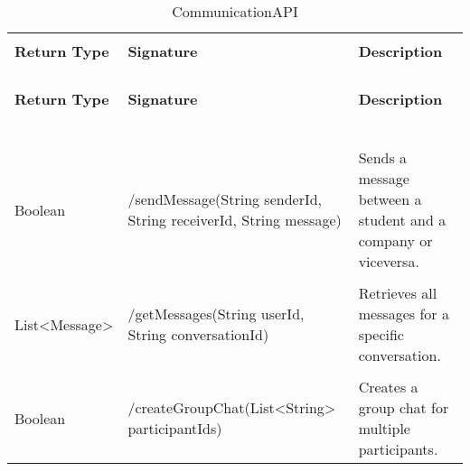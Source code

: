 \begin{longtable}{p{}p{}p{}}
    \caption{CommunicationAPI}
    \vspace{0.5em}\\
    \hline
    \vspace{0.5em}\\
    \textbf{Return Type} & \textbf{Signature} & \textbf{Description} \\
    \vspace{0.5em}\\
    \hline
    \vspace{0.5em}\\
    \endfirsthead
    \vspace{0.5em}\\
    \hline
    \vspace{0.5em}\\
    \textbf{Return Type} & \textbf{Signature} & \textbf{Description} \\
    \vspace{0.5em}\\
    \hline
    \vspace{0.5em}\\
    \endhead
    
    \vspace{0.5em}\\
    \hline
    \vspace{0.5em}\\
    \endfoot
    
    \vspace{0.5em}\\
    \hline
    \vspace{0.5em}\\
    \endlastfoot
    
    Boolean &
    /sendMessage(String senderId, String receiverId, String message) &
    Sends a message between a student and a company or viceversa. \\
    \vspace{0.5em}\\
    List<Message> &
    /getMessages(String userId, String conversationId) &
    Retrieves all messages for a specific conversation. \\
    \vspace{0.5em}\\
    Boolean &
    /createGroupChat(List<String> participantIds) &
    Creates a group chat for multiple participants. \\

\end{longtable}

